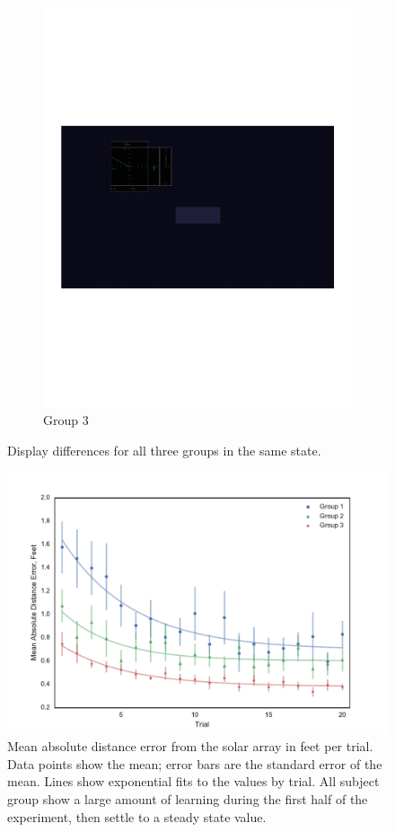 \documentclass[]{aiaa-tc}%
\begin{document}
\begin{figure}[b!]
\begin{subfigure}{.5\textwidth}
    \includegraphics[width=.99\linewidth, page=3]{figs/guidance_full.pdf}
    \caption{Group 3}
    \label{fig:sub2}
  \end{subfigure}
  \caption{Display differences for all three groups in the same state.}
  \label{fig:displays}
\end{figure}

\begin{figure}[b!]
  \centering
  \includegraphics[width=0.8\linewidth]{figs/Group_absDistErr_clean_fit_30.pdf}
  \caption{Mean absolute distance error from the solar array in feet per trial. Data points show the mean; error bars are the standard error of the mean. Lines show exponential fits to the values by trial. All subject group show a large amount of learning during the first half of the experiment, then settle to a steady state value.}
  \label{fig:performance}
\end{figure}
\end{document}
